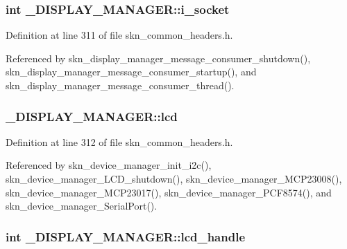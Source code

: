 \hypertarget{struct___d_i_s_p_l_a_y___m_a_n_a_g_e_r_a23e726562acd51d59c09eafa6f179137}{
\subsubsection[{i\+\_\+socket}]{\setlength{\rightskip}{0pt plus 5cm}int \+\_\+\+D\+I\+S\+P\+L\+A\+Y\+\_\+\+M\+A\+N\+A\+G\+E\+R\+::i\+\_\+socket}}\label{struct___d_i_s_p_l_a_y___m_a_n_a_g_e_r_a23e726562acd51d59c09eafa6f179137}


Definition at line 311 of file skn\+\_\+common\+\_\+headers.\+h.



Referenced by skn\+\_\+display\+\_\+manager\+\_\+message\+\_\+consumer\+\_\+shutdown(), skn\+\_\+display\+\_\+manager\+\_\+message\+\_\+consumer\+\_\+startup(), and skn\+\_\+display\+\_\+manager\+\_\+message\+\_\+consumer\+\_\+thread().

\hypertarget{struct___d_i_s_p_l_a_y___m_a_n_a_g_e_r_a182e9fb6ca9f11b3e0a35628123d46f5}{
\subsubsection[{lcd}]{ \+\_\+\+D\+I\+S\+P\+L\+A\+Y\+\_\+\+M\+A\+N\+A\+G\+E\+R\+::lcd}}\label{struct___d_i_s_p_l_a_y___m_a_n_a_g_e_r_a182e9fb6ca9f11b3e0a35628123d46f5}


Definition at line 312 of file skn\+\_\+common\+\_\+headers.\+h.



Referenced by skn\+\_\+device\+\_\+manager\+\_\+init\+\_\+i2c(), skn\+\_\+device\+\_\+manager\+\_\+\+L\+C\+D\+\_\+shutdown(), skn\+\_\+device\+\_\+manager\+\_\+\+M\+C\+P23008(), skn\+\_\+device\+\_\+manager\+\_\+\+M\+C\+P23017(), skn\+\_\+device\+\_\+manager\+\_\+\+P\+C\+F8574(), and skn\+\_\+device\+\_\+manager\+\_\+\+Serial\+Port().

\hypertarget{struct___d_i_s_p_l_a_y___m_a_n_a_g_e_r_a6ebc44b98c1483295586660829eb5a43}{
\subsubsection[{lcd\+\_\+handle}]{\setlength{\rightskip}{0pt plus 5cm}int \+\_\+\+D\+I\+S\+P\+L\+A\+Y\+\_\+\+M\+A\+N\+A\+G\+E\+R\+::lcd\+\_\+handle}}\label{struct___d_i_s_p_l_a_y___m_a_n_a_g_e_r_a6ebc44b98c1483295586660829eb5a43}


